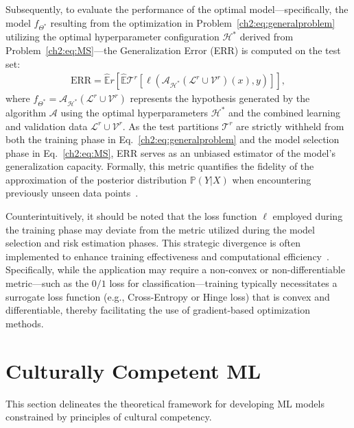 Subsequently, to evaluate the performance of the optimal model—specifically, the model $f_{\Theta^*}$ resulting from the optimization in Problem~\eqref{ch2:eq:generalproblem} utilizing the optimal hyperparameter configuration $\mathcal{H}^*$ derived from Problem~\eqref{ch2:eq:MS}—the Generalization Error (ERR) is computed on the test set:
%
\begin{align}
\label{ch2:eq:EE}
\text{ERR} = \hat{\mathbb{E}}r \left[ \hat{\mathbb{E}}{\mathcal{T}^r} \left[ \ell(\mathscr{A}_{\mathcal{H}^*}(\mathcal{L}^r \cup \mathcal{V}^r)(x), y) \right] \right],
\end{align}
%
where $f_{\Theta^*} = \mathscr{A}_{\mathcal{H}^*}(\mathcal{L}^r \cup \mathcal{V}^r)$ represents the hypothesis generated by the algorithm $\mathscr{A}$ using the optimal hyperparameters $\mathcal{H}^*$ and the combined learning and validation data $\mathcal{L}^r \cup \mathcal{V}^r$.
As the test partitions $\mathcal{T}^r$ are strictly withheld from both the training phase in Eq.~\eqref{ch2:eq:generalproblem} and the model selection phase in Eq.~\eqref{ch2:eq:MS}, ERR serves as an unbiased estimator of the model's generalization capacity. 
Formally, this metric quantifies the fidelity of the approximation of the posterior distribution $\mathbb{P}(Y|X)$ when encountering previously unseen data points~\citep{OnetoB003}.

Counterintuitively, it should be noted that the loss function $\ell$ employed during the training phase may deviate from the metric utilized during the model selection and risk estimation phases. This strategic divergence is often implemented to enhance training effectiveness and computational efficiency~\citep{rosasco2004loss,shalev2014understanding,goodfellow2016deep,aggarwal2023neural}.
Specifically, while the application may require a non-convex or non-differentiable metric—such as the $0/1$ loss for classification—training typically necessitates a surrogate loss function (e.g., Cross-Entropy or Hinge loss) that is convex and differentiable, thereby facilitating the use of gradient-based optimization methods.

\section{Culturally Competent ML}
\label{ch2:sec:makeMLcultcomp}
This section delineates the theoretical framework for developing ML models constrained by principles of cultural competency.
